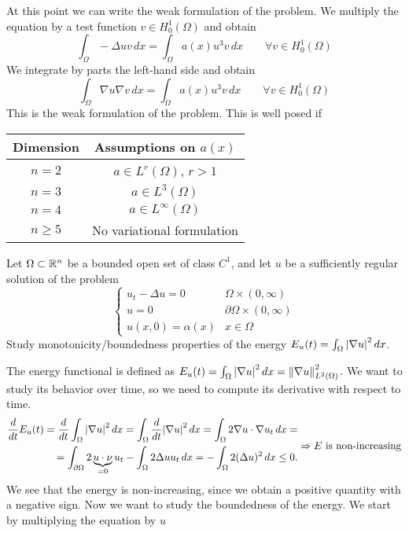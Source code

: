 At this point we can write the weak formulation of the problem. We multiply the equation by a test function \(v \in H^1_0(\Omega)\) and obtain 
\[
    \int_\Omega - \Delta u v \, dx = \int_\Omega a(x) u^3 v \, dx \qquad \forall v \in H^1_0(\Omega)
\]
We integrate by parts the left-hand side and obtain
\[
    \int_\Omega \nabla u \nabla v \, dx = \int_\Omega a(x) u^3 v \, dx \qquad \forall v \in H^1_0(\Omega)
\]
This is the weak formulation of the problem. This is well posed if 
\begin{table}[h]
    \centering
    \begin{tabular}{|c|c|}
        \hline
        Dimension & Assumptions on $a(x)$ \\
        \hline
        $n = 2$ & $a \in L^r(\Omega)$, $r > 1$ \\
        $n = 3$ & $a \in L^3(\Omega)$ \\
        $n = 4$ & $a \in L^\infty(\Omega)$ \\
        $n \geq 5$ & No variational formulation \\
        \hline
    \end{tabular}
\end{table}
\newpage

\begin{exercise}
    Let \(\Omega \subset \mathbb{R}^n\) be a bounded open set of class \(C^1\), and let \(u\) be a sufficiently regular solution of the problem
    \[
        \begin{cases}
            u_t - \Delta u = 0 & \Omega \times (0, \infty) \\
            u = 0 & \partial\Omega \times (0, \infty) \\
            u(x, 0) = \alpha(x) & x \in \Omega
        \end{cases}
    \]
    Study monotonicity/boundedness properties of the energy \(E_u(t) = \int_\Omega \abs{\nabla u}^2 \, dx\).
\end{exercise}
The energy functional is defined as \(E_u(t) = \int_\Omega \abs{\nabla u}^2 \, dx = \norm{\nabla u}^2_{L^2(\Omega)}\). We want to study its behavior over time, so we need to compute its derivative with respect to time.
\[
    \begin{split}
        \frac{d}{dt} E_u(t) = \frac{d}{dt} \int_\Omega \abs{\nabla u}^2 \, dx = \int_\Omega \frac{d}{dt} \abs{\nabla u}^2 \, dx = \int_\Omega 2 \nabla u \cdot \nabla u_t \, dx = \\
        = \int_{\partial\Omega} 2 \underbrace{u \cdot \nu}_{=0} u_t - \int_\Omega 2 \Delta u u_t \, dx = - \int_\Omega 2 (\Delta u)^2 \, dx \leq 0.
    \end{split}
    \Rightarrow E \text{ is non-increasing}
\]
We see that the energy is non-increasing, since we obtain a positive quantity with a negative sign. Now we want to study the boundedness of the energy. We start by multiplying the equation by \(u\)  

